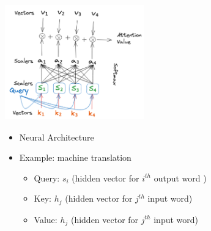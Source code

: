 \documentclass{article}
\begin{document}
\begin{minipage}{0.5\textwidth}
\includegraphics[width=6cm, height=5cm]{Transformer/Images/Attention4.png}
\end{minipage}
\begin{itemize}
    \item Neural Architecture
    \item Example: machine translation
    \begin{itemize}
        \item Query: $s_i$ (hidden vector for $i^{th}$ output word )
        \item Key: $h_j$ (hidden vector for $j^{th}$ input word)
        \item Value: $h_j$ (hidden vector for $j^{th}$ input word)
    \end{itemize}
\end{itemize}
  
\end{document}
